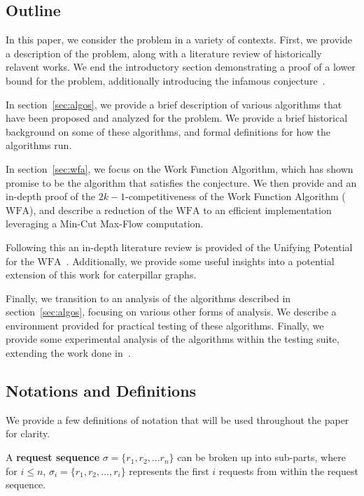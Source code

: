 \subsection{Outline}
\label{sec:out}
In this paper, we consider the \KS problem in a variety of contexts. First, we provide a description of the \KS problem, along with a literature review of historically relavent works. We end the introductory section demonstrating a proof of a lower bound for the problem, additionally introducing the infamous \KS conjecture~\cite{KS1988}. 

In section~\ref{sec:algos}, we provide a brief description of various algorithms that have been proposed and analyzed for the \KS problem. We provide a brief historical background on some of these algorithms, and formal definitions for how the algorithms run.

In section~\ref{sec:wfa}, we focus on the Work Function Algorithm, which has shown promise to be the algorithm that satisfies the \KS conjecture. We then provide and an in-depth proof of the $2k-1$-competitiveness of the Work Function Algorithm ($\mathrm{WFA}$), and describe a reduction of the $\mathrm{WFA}$ to an efficient implementation leveraging a Min-Cut Max-Flow computation.

Following this an in-depth literature review is provided of the Unifying Potential for the $\mathrm{WFA}$~\cite{unifyingPotential2021}. Additionally, we provide some useful insights into a potential extension of this work for caterpillar graphs. 

Finally, we transition to an analysis of the algorithms described in section~\ref{sec:algos}, focusing on various other forms of analysis. We describe a \CC environment provided for practical testing of these algorithms. Finally, we provide some experimental analysis of the algorithms within the testing suite, extending the work done in~\cite{independantStudy2023}.

\subsection{Notations and Definitions}

We provide a few definitions of notation that will be used throughout the paper for clarity.

\begin{definition}
    A \textbf{request sequence} $\sigma = \{ r_1, r_2, ... r_n\}$ can be broken up into sub-parts, where for $i \leq n$, $\sigma_i = \{ r_1, r_2, ..., r_i\}$ represents the first $i$ requests from within the request sequence.
\end{definition}

